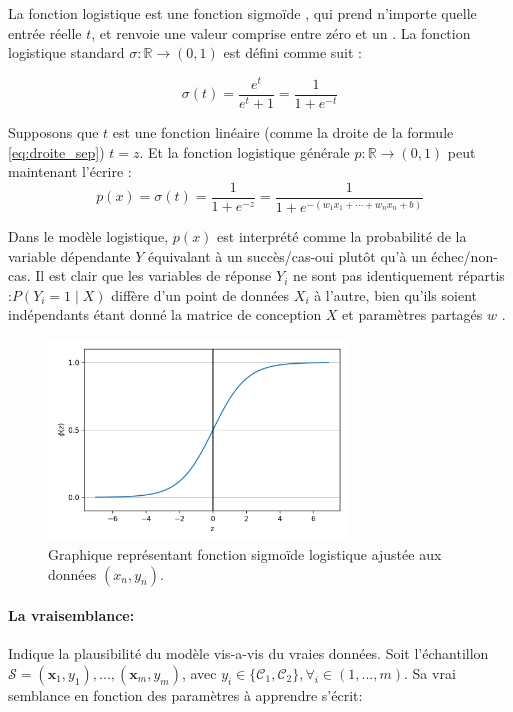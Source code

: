 		
		
		
		La fonction logistique est une fonction sigmoïde , qui prend n'importe quelle entrée réelle $t$, et renvoie une valeur comprise entre zéro et un \cite{ml2008python}. La fonction logistique standard ${\displaystyle \sigma :\mathbb {R} \rightarrow (0,1)}$ est défini comme suit :
		
		$$
		\sigma (t)={\frac {e^{t}}{e^{t}+1}}={\frac {1}{1+e^{-t}}}
		$$
		
		Supposons que $t$ est une fonction linéaire (comme la droite de la formule \ref{eq:droite_sep}) $t = z$. Et la fonction logistique générale ${ p:\mathbb {R} \rightarrow (0,1)}$ peut maintenant l'écrire :
		\begin{equation}\label{eq:sigmoid}
			{\displaystyle p(x)=\sigma (t)= {\frac {1}{1+e^{-z}}} ={\frac {1}{1+e^{-(w _{1}x_{1}+\cdots +w_{n}x_{n}+b)}}}}
		\end{equation}
		
		
		
		Dans le modèle logistique, $p(x)$ est interprété comme la probabilité de la variable dépendante ${Y}$ équivalant à un succès/cas-oui plutôt qu'à un échec/non-cas. Il est clair que les variables de réponse $Y_{i}$ ne sont pas identiquement répartis :$P(Y_{i}=1\mid X)$ diffère d'un point de données $X_{i}$ à l'autre, bien qu'ils soient indépendants étant donné la matrice de conception $X$ et paramètres partagés $w$ \cite{antoine2018apprentissage}. 
		
	
		\begin{figure}[bth]%
			\centering
			\includegraphics[width=8cm]{images/reg_log_curve.png}
			\caption{Graphique représentant fonction sigmoïde logistique ajustée aux données $(x_n , y_n)$. \cite[image de][]{ml2008python}
			}
			\label{fig:reg_log_curve}
		\end{figure}
	
	\paragraph*{La vraisemblance:}Indique la plausibilité du  modèle vis-a-vis du vraies données.
	Soit l'échantillon $ \mathcal{S} = {(\mathbf{x}_1, y_1),..., (\mathbf{x}_m, y_m)}$, avec $y_i \in \{\mathcal{C}_1,\mathcal{C}_2\}, \forall_i \in (1,...,m)$. Sa vrai semblance en fonction des paramètres à apprendre s'écrit:
	
